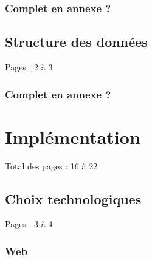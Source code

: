 \documentclass{EPL-master-thesis-covers-FR}
\begin{document}
			\subsection*{Complet en annexe ?}

		\section{Structure des données}

			Pages : 2 à 3

			\subsection*{Complet en annexe ?}

	\chapter{Implémentation}

		Total des pages : 16 à 22


		\section{Choix technologiques}

			Pages : 3 à 4



			\subsection*{Web}
\end{document}
